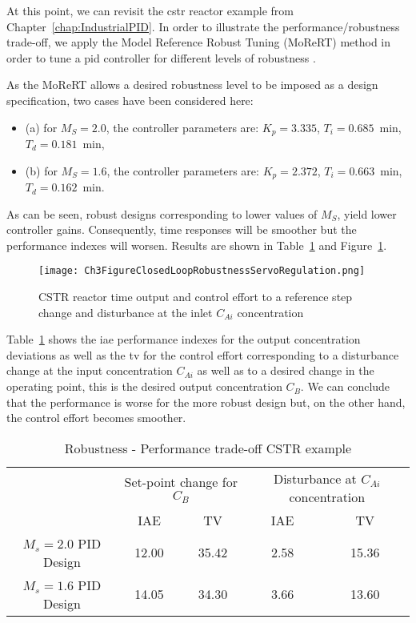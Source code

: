 At this point, we can revisit the \gls{cstr} reactor example from Chapter~\ref{chap:IndustrialPID}. In order to illustrate the performance/robustness trade-off, we apply the Model Reference Robust Tuning (MoReRT) method in order to tune a \gls{pid} controller for different levels of robustness \citep{Alfaro2016}.

As the MoReRT allows a desired robustness level to be imposed as a design specification, two cases have been considered here:
\begin{itemize}
	\item (a) for $M_S=2.0$, the controller parameters are: $K_p=3.335$, $T_i =0.685$~min, $T_d=0.181$~min,
	\item (b) for $M_S=1.6$, the controller parameters are: $K_p=2.372$, $T_i=0.663$~min, $T_d=0.162$~min.
\end{itemize}

 As can be seen, robust designs corresponding to lower values of $M_S$, yield lower controller gains. Consequently, time responses will be smoother but the performance indexes will worsen. Results are shown in Table~\ref{tab:cstrtradeoff} and Figure~\ref{ch3:fig:Ch3FigureClosedLoopRobustnessServoRegulation}. 
%
\begin{figure}[tb]
    \begin{center}
        \texttt{[image: Ch3FigureClosedLoopRobustnessServoRegulation.png]}
        \caption{CSTR reactor time output and control effort to a reference step change and disturbance at the inlet $C_{Ai}$ concentration }
        \label{ch3:fig:Ch3FigureClosedLoopRobustnessServoRegulation}
    \end{center}
\end{figure}

Table~\ref{tab:cstrtradeoff} shows the \gls{iae} performance indexes for the output concentration deviations as well as the \gls{tv} for the control effort corresponding to a disturbance change at the input concentration $C_{Ai}$ as well as to a desired change in the operating point, this is the desired output concentration $C_B$. We can conclude that the performance is worse for the more robust design but, on the other hand, the control effort becomes smoother. 
\begin{table}[tb]
	\caption{Robustness - Performance trade-off CSTR example} \label{tab:cstrtradeoff}
	\centering
    \begin{tabular}{ccccc}
    \toprule
    	 & \multicolumn{2}{c}{Set-point change for $C_B$}  & \multicolumn{2}{c}{Disturbance at $C_{Ai}$ concentration}\\
   		 & IAE & TV & IAE & TV\\
    \midrule
    $M_s=2.0$ PID Design   & 12.00 & 35.42 & 2.58 & 15.36 \\
    $M_s=1.6$ PID Design   & 14.05 & 34.30 & 3.66 & 13.60 \\
    \bottomrule
    \end{tabular}
\end{table}
%
